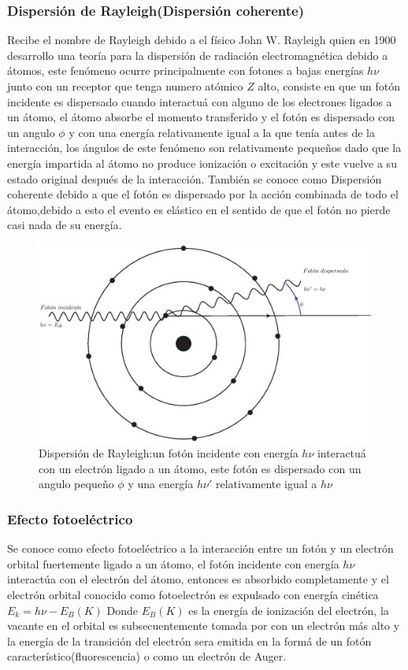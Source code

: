 \subsubsection{Dispersión de Rayleigh(Dispersión coherente)}
Recibe el nombre de Rayleigh debido a el físico John W. Rayleigh quien en 1900 desarrollo una teoría para la dispersión de radiación electromagnética debido a átomos, este fenómeno ocurre principalmente con fotones a bajas energías $h\nu$ junto con un receptor que tenga numero atómico $Z$ alto, consiste en que un fotón incidente es dispersado cuando interactuá con alguno de los electrones ligados a un átomo, el átomo absorbe el momento transferido y el fotón es dispersado con un angulo $\phi$ y con una energía relativamente igual a la que tenía antes de la interacción, los ángulos de este fenómeno son relativamente pequeños dado que la energía impartida al átomo no produce ionización o excitación y este vuelve a su estado original después de la interacción\cite{Podgorsak}.
También se conoce como Dispersión coherente debido a que el fotón es dispersado por  la acción combinada de todo el átomo,debido a esto el evento es elástico en el sentido de que el fotón no pierde casi nada de su energía\cite{Frank}.

\begin{figure}[htbp]
    \centering
    \includegraphics[width=.71\linewidth]{./Figures/Ray.eps}
    \caption[Dispersión de Rayleigh]{Dispersión de Rayleigh:un fotón incidente con energía $h\nu$ interactuá con un electrón ligado a un átomo, este fotón es dispersado con un angulo pequeño $\phi$ y una energía $h\nu '$ relativamente igual a $h\nu$ }
    \label{fig:DR}
\end{figure}


\subsubsection{Efecto fotoeléctrico}

Se conoce como efecto fotoeléctrico a la interacción entre un fotón y un electrón orbital fuertemente ligado a un átomo, el fotón incidente con energía $h\nu$ interactúa con el electrón del átomo, entonces es absorbido completamente y el electrón orbital conocido como fotoelectrón es expulsado con energía cinética $E_k=h\nu-E_B(K)$ Donde $E_B(K)$ es la energía de ionización del electrón, la vacante en el orbital es subsecuentemente tomada por con un electrón más alto y la energía de la transición del electrón sera emitida en la formá de un fotón característico(fluorescencia) o como un electrón de Auger.

